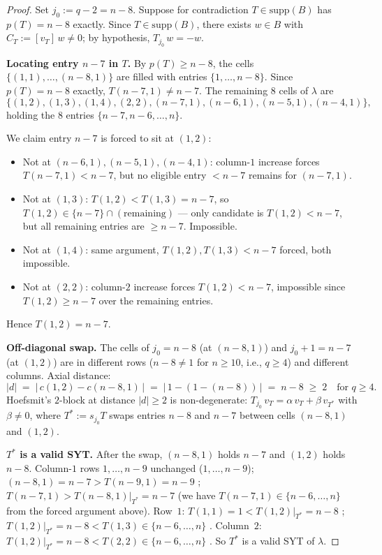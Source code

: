 \documentclass[11pt]{article}
\theoremstyle{definition}
\newcommand{\supp}{\mathrm{supp}}
\begin{document}
\begin{proof}
Set $j_0 := q - 2 = n - 8$.  Suppose for contradiction $T \in
\supp(B)$ has $p(T) = n - 8$ exactly.  Since $T \in \supp(B)$,
there exists $w \in B$ with $C_T := [v_T]\,w \ne 0$; by hypothesis,
$T_{j_0}\,w = -w$.

\medskip\textbf{Locating entry $n - 7$ in $T$.}  By $p(T) \ge n - 8$,
the cells $\{(1, 1), \ldots, (n - 8, 1)\}$ are filled with entries
$\{1, \ldots, n - 8\}$.  Since $p(T) = n - 8$ exactly,
$T(n - 7, 1) \ne n - 7$.  The remaining $8$ cells of $\lambda$ are
\[
   \{(1, 2),(1, 3),(1, 4),(2, 2),(n-7,1),(n-6,1),(n-5,1),(n-4,1)\},
\]
holding the $8$ entries $\{n-7, n-6, \ldots, n\}$.

We claim entry $n - 7$ is forced to sit at $(1, 2)$:
\begin{itemize}[topsep=0.3em,itemsep=0.1em]
\item Not at $(n - 6, 1), (n - 5, 1), (n - 4, 1)$: column-$1$
   increase forces $T(n - 7, 1) < n - 7$, but no eligible entry
   $< n - 7$ remains for $(n - 7, 1)$.
\item Not at $(1, 3)$: $T(1, 2) < T(1, 3) = n - 7$, so $T(1, 2) \in
   \{n - 7\} \cap (\text{remaining})$ — only candidate is $T(1, 2) <
   n - 7$, but all remaining entries are $\ge n - 7$.  Impossible.
\item Not at $(1, 4)$: same argument, $T(1, 2), T(1, 3) < n - 7$
   forced, both impossible.
\item Not at $(2, 2)$: column-$2$ increase forces $T(1, 2) < n - 7$,
   impossible since $T(1, 2) \ge n - 7$ over the remaining entries.
\end{itemize}
Hence $T(1, 2) = n - 7$.

\medskip\textbf{Off-diagonal swap.}  The cells of $j_0 = n - 8$ (at
$(n - 8, 1)$) and $j_0 + 1 = n - 7$ (at $(1, 2)$) are in different
rows ($n - 8 \ne 1$ for $n \ge 10$, i.e., $q \ge 4$) and different
columns.  Axial distance:
\[
   |d| \;=\; |\,c(1, 2) - c(n-8, 1)\,|
   \;=\; |\,1 - (1 - (n-8))\,|
   \;=\; n - 8 \;\ge\; 2 \quad \text{for } q \ge 4.
\]
Hoefsmit's $2$-block at distance $|d| \ge 2$ is non-degenerate:
$T_{j_0}\,v_T = \alpha\,v_T + \beta\,v_{T^*}$ with $\beta \ne 0$,
where $T^* := s_{j_0}T$ swaps entries $n - 8$ and $n - 7$ between
cells $(n - 8, 1)$ and $(1, 2)$.

\medskip\textbf{$T^*$ is a valid SYT.}  After the swap, $(n-8, 1)$
holds $n - 7$ and $(1, 2)$ holds $n - 8$.  Column-$1$ rows
$1, \ldots, n - 9$ unchanged ($1, \ldots, n - 9$); $(n - 8, 1) =
n - 7 > T(n - 9, 1) = n - 9$ \checkmark; $T(n - 7, 1) > T(n - 8, 1)|_{T^*}
= n - 7$ \checkmark (we have $T(n - 7, 1) \in \{n - 6, \ldots, n\}$ from the
forced argument above).  Row~$1$: $T(1, 1) = 1 < T(1, 2)|_{T^*} =
n - 8$ \checkmark; $T(1, 2)|_{T^*} = n - 8 < T(1, 3) \in \{n - 6, \ldots, n\}$
\checkmark.  Column~$2$: $T(1, 2)|_{T^*} = n - 8 < T(2, 2) \in
\{n - 6, \ldots, n\}$ \checkmark.  So $T^*$ is a valid SYT of $\lambda$.


\end{proof}
\end{document}
